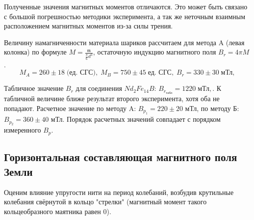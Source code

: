 \documentclass[a4paper,12pt]{article}
\begin{document}
Полученные значения магнитных моментов отличаются. Это может быть связано с большой погрешностью методики эксперимента, а так же неточным взаимным расположением магнитных моментов из-за силы трения.

Величину намагниченности материала шариков рассчитаем для метода A (левая колонка) по формуле $M = \frac{\mathfrak{m}}{\frac{\pi}{6} d^3}$, остаточную индукцию магнитного поля $B_r = 4\pi M$. $$M_A = 260 \pm 18 \; \text{(ед. СГС)}, \;M_B = 750\pm45\; \text{ед. СГС},\; B_r = 330 \pm 30 \; \text{мТл}, $$

Табличное значение $B_r$ для соединения $Nd_2Fe_{14}B$:
$B_{r_{\text{табл}}} = 1220 \; \text{мТл},$. К табличной величине ближе результат второго эксперимента,
хотя оба не попадают.
Расчетное значение по методу A: $B_{p_1} = 220 \pm 20$ мТл, по методу Б: $B_{p_2} = 360\pm40$ мТл.
Порядок расчетных значений совпадает с порядком измеренного $B_p$.

\subsection{Горизонтальная составляющая магнитного поля Земли}

Оценим влияние упругости нити на период колебаний, возбудив крутильные колебания свёрнутой в кольцо "стрелки" (магнитный момент такого кольцеобразного маятника равен 0).
\end{document}
